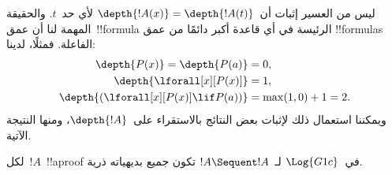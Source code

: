 \documentclass[../../../include/open-logic-section]{subfiles}
\begin{document}
ليس من العسير إثبات أن~$\depth{!A(x)}=\depth{!A(t)}$ لأي حد~$t$. والحقيقة
المهمة لنا أن عمق~!!{formula} الرئيسة في أي قاعدة أكبر دائمًا من عمق
!!{formula}s الفاعلة. فمثلًا، لدينا:
\begin{align*}
\depth{P(x)} = \depth{P(a)} & = 0,\\
\depth{\lforall[x][P(x)]} & = 1,\\
\depth{(\lforall[x][P(x)] \lif P(a))} & = \max(1,0) + 1 = 2.
\end{align*}
ويمكننا استعمال ذلك لإثبات بعض النتائج بالاستقراء على~$\depth{!A}$، ومنها
النتيجة الآتية.

\begin{prop}
لكل~$!A$~!!a{proof} في~$\Log{G1c}$ لـ~$!A\Sequent !A$ تكون جميع
بديهياته ذرية.
\end{prop}
\end{document}
